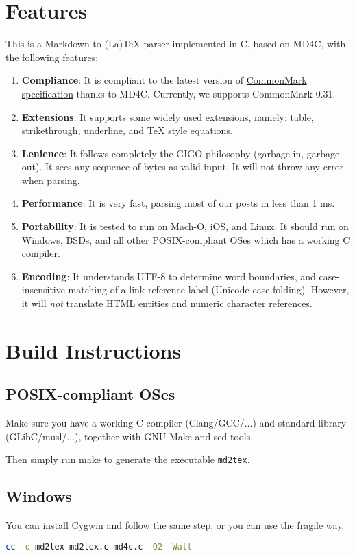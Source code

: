 \section{Features}
This is a Markdown to (La)TeX parser implemented in C, based on MD4C, with the following features:\par
\begin{enumerate}
\item \textbf{Compliance}: It is compliant to the latest version of \href{http://spec.commonmark.org/}{CommonMark specification} thanks to MD4C. Currently, we supports CommonMark 0.31.
\item \textbf{Extensions}: It supports some widely used extensions, namely: table, strikethrough, underline, and TeX style equations.
\item \textbf{Lenience}: It follows completely the GIGO philosophy (garbage in, garbage out). It sees any sequence of bytes as valid input. It will not throw any error when parsing.
\item \textbf{Performance}: It is very fast, parsing most of our posts in less than 1 ms.
\item \textbf{Portability}: It is tested to run on Mach-O, iOS, and Linux. It should run on Windows, BSDs, and all other POSIX-compliant OSes which has a working C compiler.
\item \textbf{Encoding}: It understands UTF-8 to determine word boundaries, and case-insensitive matching of a link reference label (Unicode case folding). However, it will \textit{not} translate HTML entities and numeric character references.
\end{enumerate}
\section{Build Instructions}
\subsection{POSIX-compliant OSes}
Make sure you have a working C compiler (Clang/GCC/...) and standard library (GLibC/musl/...), together with GNU Make and sed tools.\par
Then simply run make to generate the executable \verb!md2tex!.\par
\subsection{Windows}
You can install Cygwin and follow the same step, or you can use the fragile way.\par
\begin{lstlisting}[language=sh]
cc -o md2tex md2tex.c md4c.c -O2 -Wall
\end{lstlisting}
